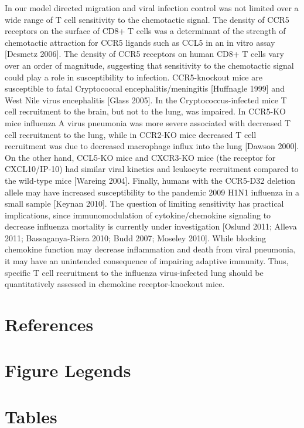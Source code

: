 \documentclass[10pt]{article}
\begin{document}
In our model directed migration and viral infection control was not limited over a wide range of T cell sensitivity to the chemotactic signal.  The density of CCR5 receptors on the surface of CD8+ T cells was a determinant of the strength of chemotactic attraction for CCR5 ligands such as CCL5 in an in vitro assay [Desmetz 2006].   The density of CCR5 receptors on human CD8+ T cells vary over an order of magnitude, suggesting that sensitivity to the chemotactic signal could play a role in susceptibility to infection.  CCR5-knockout mice are susceptible to fatal Cryptococcal encephalitis/meningitis [Huffnagle 1999] and West Nile virus encephalitis [Glass 2005].  In the Cryptococcus-infected mice T cell recruitment to the brain, but not to the lung, was impaired.   In CCR5-KO mice influenza A virus pneumonia was more severe associated with decreased T cell recruitment to the lung, while in CCR2-KO mice decreased T cell recruitment was due to decreased macrophage influx into the lung [Dawson 2000].  On the other hand, CCL5-KO mice and CXCR3-KO mice (the receptor for CXCL10/IP-10) had similar viral kinetics and leukocyte recruitment compared to the wild-type mice [Wareing 2004].  Finally, humans with the CCR5-D32 deletion allele may have increased susceptibility to the pandemic 2009 H1N1 influenza in a small sample [Keynan 2010].  The question of limiting sensitivity has practical implications, since immunomodulation of cytokine/chemokine signaling to decrease influenza mortality is currently under investigation [Oslund 2011; Alleva 2011; Bassaganya-Riera 2010; Budd 2007; Moseley 2010].  While blocking chemokine function may decrease inflammation and death from viral pneumonia, it may have an unintended consequence of impairing adaptive immunity.  Thus, specific T cell recruitment to the influenza virus-infected lung should be quantitatively assessed in chemokine receptor-knockout mice.


\section*{References}


\section*{Figure Legends}


\section*{Tables}
\end{document}
